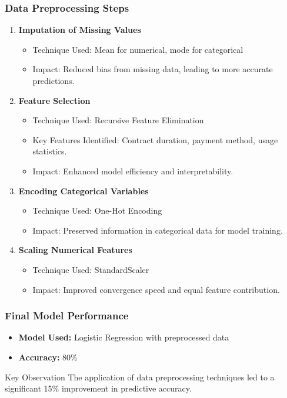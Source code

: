 \documentclass[aspectratio=169]{beamer}
\begin{document}
\begin{frame}
    \frametitle{Data Preprocessing Steps}
    \begin{enumerate}
        \item \textbf{Imputation of Missing Values}
        \begin{itemize}
            \item Technique Used: Mean for numerical, mode for categorical
            \item Impact: Reduced bias from missing data, leading to more accurate predictions.
        \end{itemize}
        
        \item \textbf{Feature Selection}
        \begin{itemize}
            \item Technique Used: Recursive Feature Elimination
            \item Key Features Identified: Contract duration, payment method, usage statistics.
            \item Impact: Enhanced model efficiency and interpretability.
        \end{itemize}
        
        \item \textbf{Encoding Categorical Variables}
        \begin{itemize}
            \item Technique Used: One-Hot Encoding
            \item Impact: Preserved information in categorical data for model training.
        \end{itemize}
        
        \item \textbf{Scaling Numerical Features}
        \begin{itemize}
            \item Technique Used: StandardScaler
            \item Impact: Improved convergence speed and equal feature contribution.
        \end{itemize}
    \end{enumerate}
\end{frame}

\begin{frame}
    \frametitle{Final Model Performance}
    \begin{itemize}
        \item \textbf{Model Used:} Logistic Regression with preprocessed data
        \item \textbf{Accuracy:} 80\%
    \end{itemize}
    \begin{block}{Key Observation}
        The application of data preprocessing techniques led to a significant 15\% improvement in predictive accuracy.
    \end{block}
\end{frame}
\end{document}
